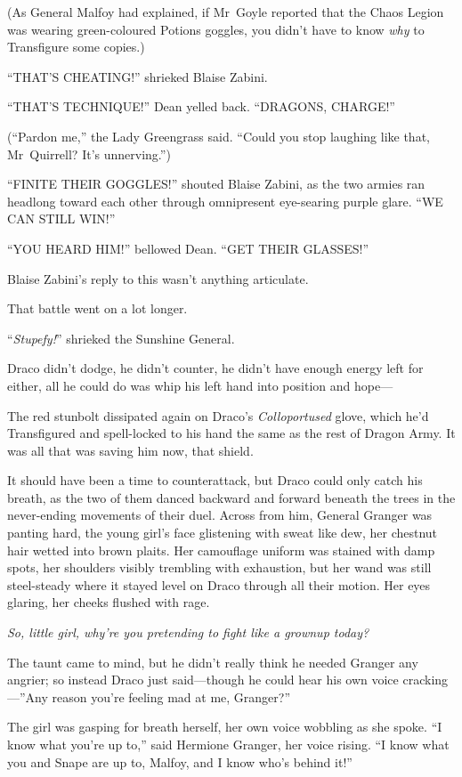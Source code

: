 (As General Malfoy had explained, if Mr~Goyle reported that the Chaos Legion was wearing green-coloured Potions goggles, you didn’t have to know \emph{why} to Transfigure some copies.)

“THAT’S CHEATING!” shrieked Blaise Zabini.

“THAT’S TECHNIQUE!” Dean yelled back. “DRAGONS, CHARGE!”

(“Pardon me,” the Lady Greengrass said. “Could you stop laughing like that, Mr~Quirrell? It’s unnerving.”)

“FINITE THEIR GOGGLES!” shouted Blaise Zabini, as the two armies ran headlong toward each other through omnipresent eye-searing purple glare. “WE CAN STILL WIN!”

“YOU HEARD HIM!” bellowed Dean. “GET THEIR GLASSES!”

Blaise Zabini’s reply to this wasn’t anything articulate.

That battle went on a lot longer.

\later

“\emph{Stupefy!}” shrieked the Sunshine General.

Draco didn’t dodge, he didn’t counter, he didn’t have enough energy left for either, all he could do was whip his left hand into position and hope—

The red stunbolt dissipated again on Draco’s \emph{Colloportused} glove, which he’d Transfigured and spell-locked to his hand the same as the rest of Dragon Army. It was all that was saving him now, that shield.

It should have been a time to counterattack, but Draco could only catch his breath, as the two of them danced backward and forward beneath the trees in the never-ending movements of their duel. Across from him, General Granger was panting hard, the young girl’s face glistening with sweat like dew, her chestnut hair wetted into brown plaits. Her camouflage uniform was stained with damp spots, her shoulders visibly trembling with exhaustion, but her wand was still steel-steady where it stayed level on Draco through all their motion. Her eyes glaring, her cheeks flushed with rage.

\emph{So, little girl, why’re you pretending to fight like a grownup today?}

The taunt came to mind, but he didn’t really think he needed Granger any angrier; so instead Draco just said—though he could hear his own voice cracking—”Any reason you’re feeling mad at me, Granger?”

The girl was gasping for breath herself, her own voice wobbling as she spoke. “I know what you’re up to,” said Hermione Granger, her voice rising. “I know what you and Snape are up to, Malfoy, and I know who’s behind it!”

